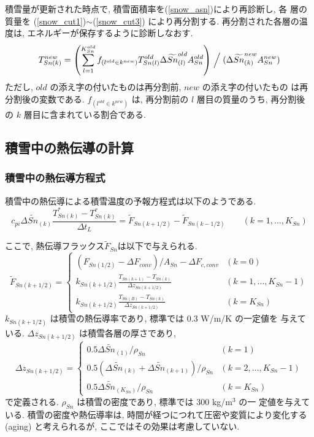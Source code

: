 積雪量が更新された時点で, 積雪面積率を(\ref{snow_asn})により再診断し, 各
層の質量を (\ref{snow_cut1})$\sim$(\ref{snow_cut3}) により再分割する.
再分割された各層の温度は, エネルギーが保存するように診断しなおす.
\begin{equation}
 T_{Sn(k)}^{new} = \left(\sum_{l=1}^{K_{Sn}^{old}} f_{(l^{old}\in k^{new})} T_{Sn(l)}^{old} \Delta \widetilde{Sn}_{(l)}^{old} A_{Sn}^{old} \right)
\Bigm/ (\Delta \widetilde{Sn}_{(k)}^{new} A_{Sn}^{new})
\end{equation}
ただし, $old$ の添え字の付いたものは再分割前, $new$ の添え字の付いたもの
は再分割後の変数である.
$f_{(l^{old}\in k^{new})}$ は, 再分割前の $l$ 層目の質量のうち, 再分割後
の $k$ 層目に含まれている割合である.

\subsection{積雪中の熱伝導の計算}

\subsubsection{積雪中の熱伝導方程式}

積雪中の熱伝導による積雪温度の予報方程式は以下のようである.
\begin{equation}
c_{pi}\Delta \widetilde{Sn}_{(k)} \frac{T_{Sn(k)}^* - T_{Sn(k)}^{\tau}}{\Delta t_L} = \widetilde{F}_{Sn(k+1/2)} - \widetilde{F}_{Sn(k-1/2)}
\qquad (k=1,\ldots,K_{Sn})
\label{snow_diff}
\end{equation}

ここで, 熱伝導フラックス$\widetilde{F}_{Sn}$は以下で与えられる.
\begin{equation}
 \widetilde{F}_{Sn(k+1/2)} =
\left\{
\begin{array}{ll}
( F_{Sn(1/2)} - \Delta F_{conv})/A_{Sn} - \Delta F_{c,conv}
& (k=0)\\
\displaystyle{
k_{Sn(k+1/2)} \frac{T_{Sn(k+1)} - T_{Sn(k)}}{\Delta z_{Sn(k+1/2)}}
}
& (k=1,\ldots,K_{Sn}-1) \\
\displaystyle{
k_{Sn(k+1/2)} \frac{T_{Sn(B)} - T_{Sn(k)}}{\Delta z_{Sn(k+1/2)}}
}
& (k=K_{Sn})
\end{array}
\right. \label{snow_dflux}
\end{equation}
$k_{Sn(k+1/2)}$ は積雪の熱伝導率であり, 標準では 0.3 W/m/K の一定値を
与えている. $\Delta z_{Sn(k+1/2)}$ は積雪各層の厚さであり,
\begin{equation}
 \Delta z_{Sn(k+1/2)} =
\left\{
\begin{array}{ll}
 0.5 \Delta \widetilde{Sn}_{(1)} / \rho_{Sn} & (k=1)\\
 0.5 (\Delta \widetilde{Sn}_{(k)}+\Delta \widetilde{Sn}_{(k+1)}) / \rho_{Sn}
& (k=2,\ldots,K_{Sn}-1)\\
 0.5 \Delta \widetilde{Sn}_{(K_{Sn})} / \rho_{Sn} & (k=K_{Sn})
\end{array}
\right.
\end{equation}
で定義される. $\rho_{Sn}$ は積雪の密度であり, 標準では 300 kg/m$^3$ の一
定値を与えている.
積雪の密度や熱伝導率は, 時間が経つにつれて圧密や変質により変化する
(aging) と考えられるが, ここではその効果は考慮していない.

